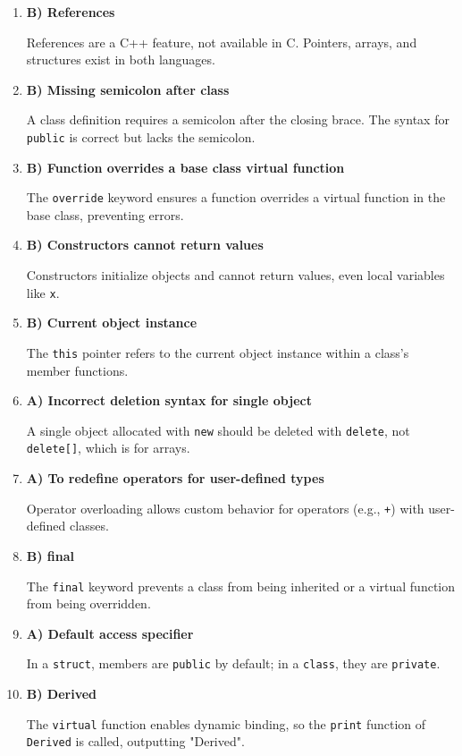 \documentclass[a4paper,12pt]{article}
\begin{document}
\begin{enumerate}
    \item \textbf{B) References}

    References are a C++ feature, not available in C. Pointers, arrays, and structures exist in both languages.

    \item \textbf{B) Missing semicolon after class}

    A class definition requires a semicolon after the closing brace. The syntax for \verb|public| is correct but lacks the semicolon.

    \item \textbf{B) Function overrides a base class virtual function}

    The \verb|override| keyword ensures a function overrides a virtual function in the base class, preventing errors.

    \item \textbf{B) Constructors cannot return values}

    Constructors initialize objects and cannot return values, even local variables like \verb|x|.

    \item \textbf{B) Current object instance}

    The \verb|this| pointer refers to the current object instance within a class’s member functions.

    \item \textbf{A) Incorrect deletion syntax for single object}

    A single object allocated with \verb|new| should be deleted with \verb|delete|, not \verb|delete[]|, which is for arrays.

    \item \textbf{A) To redefine operators for user-defined types}

    Operator overloading allows custom behavior for operators (e.g., \verb|+|) with user-defined classes.

    \item \textbf{B) final}

    The \verb|final| keyword prevents a class from being inherited or a virtual function from being overridden.

    \item \textbf{A) Default access specifier}

    In a \verb|struct|, members are \verb|public| by default; in a \verb|class|, they are \verb|private|.

    \item \textbf{B) Derived}

    The \verb|virtual| function enables dynamic binding, so the \verb|print| function of \verb|Derived| is called, outputting "Derived".
\end{enumerate}
\end{document}
